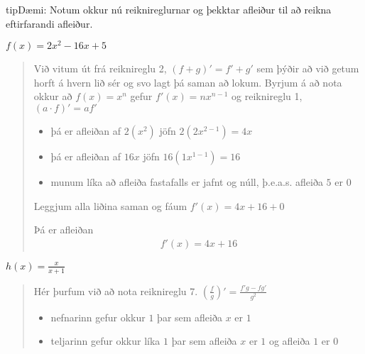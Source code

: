 \documentclass[a4paper,10pt,icelandic]{sphinxmanual}
\begin{document}
\begin{sphinxadmonition}{tip}{Dæmi:}
Notum okkur nú reiknireglurnar og þekktar afleiður til að reikna eftirfarandi afleiður.

 \(f(x) = 2x^2-16x+5\)
\begin{quote}

Við vitum út frá reiknireglu 2, \((f+g)'=f'+g'\) sem þýðir að við getum horft á hvern lið sér og svo lagt þá saman að lokum.
Byrjum á að nota okkur að \(f(x)=x^n\) gefur \(f'(x)=nx^{n-1}\) og reiknireglu 1, \((a\cdot f)'=af'\)
\begin{itemize}
\item {} 
þá er afleiðan af \(2(x^2)\) jöfn \(2(2x^{2-1}) = 4x\)

\item {} 
þá er afleiðan af \(16x\) jöfn \(16(1x^{1-1} )= 16\)

\item {} 
munum líka að afleiða fastafalls er jafnt og núll, þ.e.a.s. afleiða \(5\) er \(0\)

\end{itemize}

Leggjum alla liðina saman og fáum \(f'(x) = 4x + 16 + 0\)

Þá er afleiðan
\begin{equation*}
\begin{split}f'(x) = 4x + 16\end{split}
\end{equation*}\end{quote}

 \(h(x) = \frac{x}{x+1}\)
\begin{quote}

Hér þurfum við að nota reiknireglu 7. \(\left(\frac{f}{g}\right)'=\frac{f'g-fg'}{g^2}\)
\begin{itemize}
\item {} 
nefnarinn  gefur okkur \(1\) þar sem afleiða \(x\) er \(1\)

\item {} 
teljarinn gefur okkur líka \(1\) þar sem afleiða \(x\) er \(1\) og afleiða \(1\) er \(0\)

\end{itemize}


\end{quote}
\end{sphinxadmonition}
\end{document}
